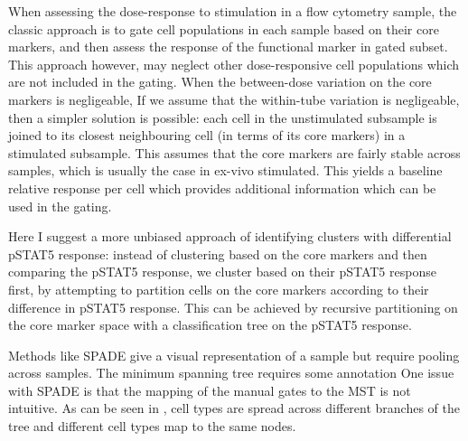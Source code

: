 When assessing the dose-response to stimulation in a flow cytometry sample,
the classic approach is to gate cell populations in each sample based on their core markers,
and then assess the response of the functional marker in gated subset.
This approach however, may neglect other dose-responsive cell populations which are not included in the gating.
When the between-dose variation on the core markers is negligeable,
If we assume that the within-tube variation is negligeable, then a simpler solution is possible:
each cell in the unstimulated subsample is joined to its closest neighbouring cell (in terms of its core markers) in a stimulated subsample.
This assumes that the core markers are fairly stable across samples, which is usually the case in ex-vivo stimulated.
This yields a baseline relative response per cell which provides additional information which can be used in the gating.

Here I suggest a more unbiased approach of identifying clusters with differential pSTAT5 response:
instead of clustering based on the core markers and then comparing the pSTAT5 response, we cluster based on their pSTAT5 response first,
by attempting to partition cells on the core markers according to their difference in pSTAT5 response.
This can be achieved by recursive partitioning on the core marker space with a classification tree on the pSTAT5 response.


Methods like SPADE give a visual representation of a sample but require pooling across samples.
The minimum spanning tree requires some annotation
One issue with SPADE is that the mapping of the manual gates to the MST is not intuitive.
As can be seen in , cell types are spread across different branches of the tree and different cell types map to the same nodes.

